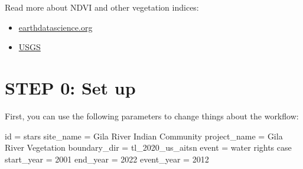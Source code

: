 \documentclass[
  letterpaper,
  DIV=11,
  numbers=noendperiod,
  oneside]{scrreprt}
\newenvironment{Shaded}{\begin{snugshade}}{\end{snugshade}}
\newcommand{\BuiltInTok}[1]{\textcolor[rgb]{0.00,0.23,0.31}{#1}}
\newcommand{\NormalTok}[1]{\textcolor[rgb]{0.00,0.23,0.31}{#1}}
\newcommand{\OperatorTok}[1]{\textcolor[rgb]{0.37,0.37,0.37}{#1}}
\newcommand{\StringTok}[1]{\textcolor[rgb]{0.13,0.47,0.30}{#1}}
\providecommand{\tightlist}{%
  \setlength{\itemsep}{0pt}\setlength{\parskip}{0pt}}
\begin{document}
\begin{tcolorbox}[enhanced jigsaw, colbacktitle=quarto-callout-color!10!white, opacityback=0, bottomtitle=1mm, toptitle=1mm, bottomrule=.15mm, left=2mm, colframe=quarto-callout-color-frame, leftrule=.75mm, opacitybacktitle=0.6, colback=white, rightrule=.15mm, toprule=.15mm, breakable, titlerule=0mm, title=\textcolor{quarto-callout-color}{\faInfo}\hspace{0.5em}{Read More}, coltitle=black, arc=.35mm]

Read more about NDVI and other vegetation indices:

\begin{itemize}
\tightlist
\item
  \href{https://www.earthdatascience.org/courses/use-data-open-source-python/multispectral-remote-sensing/vegetation-indices-in-python/calculate-NDVI-python/}{earthdatascience.org}
\item
  \href{https://www.usgs.gov/landsat-missions/landsat-surface-reflectance-derived-spectral-indices}{USGS}
\end{itemize}

\end{tcolorbox}


\chapter{STEP 0: Set up}\label{step-0-set-up}

First, you can use the following parameters to change things about the
workflow:

\begin{Shaded}
\begin{Highlighting}[]
\BuiltInTok{id} \OperatorTok{=} \StringTok{\textquotesingle{}stars\textquotesingle{}}
\NormalTok{site\_name }\OperatorTok{=} \StringTok{\textquotesingle{}Gila River Indian Community\textquotesingle{}}
\NormalTok{project\_name }\OperatorTok{=} \StringTok{\textquotesingle{}Gila River Vegetation\textquotesingle{}}
\NormalTok{boundary\_dir }\OperatorTok{=} \StringTok{\textquotesingle{}tl\_2020\_us\_aitsn\textquotesingle{}}
\NormalTok{event }\OperatorTok{=} \StringTok{\textquotesingle{}water rights case\textquotesingle{}}
\NormalTok{start\_year }\OperatorTok{=} \StringTok{\textquotesingle{}2001\textquotesingle{}}
\NormalTok{end\_year }\OperatorTok{=} \StringTok{\textquotesingle{}2022\textquotesingle{}}
\NormalTok{event\_year }\OperatorTok{=} \StringTok{\textquotesingle{}2012\textquotesingle{}}
\end{Highlighting}
\end{Shaded}
\end{document}
